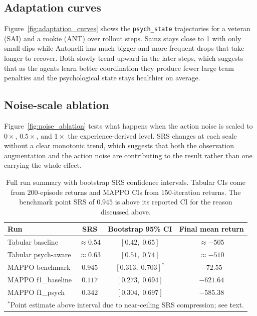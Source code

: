 \documentclass[11pt]{article}
\begin{document}
\subsection*{Adaptation curves}
Figure~\ref{fig:adaptation_curves} shows the \texttt{psych\_state} trajectories for a
veteran (SAI) and a rookie (ANT) over rollout steps. Sainz stays close to 1 with only
small dips while Antonelli has much bigger and more frequent drops that take longer to
recover. Both slowly trend upward in the later steps, which suggests that as the agents
learn better coordination they produce fewer large team penalties and the psychological
state stays healthier on average.

\subsection*{Noise-scale ablation}
Figure~\ref{fig:noise_ablation} tests what happens when the action noise is scaled to
$0\times$, $0.5\times$, and $1\times$ the experience-derived level. SRS changes at each
scale without a clear monotonic trend, which suggests that both the observation
augmentation and the action noise are contributing to the result rather than one carrying
the whole effect.

\begin{table}[h]
  \caption{Full run summary with bootstrap SRS confidence intervals. Tabular CIs come
  from 200-episode returns and MAPPO CIs from 150-iteration returns. The benchmark
  point SRS of $0.945$ is above its reported CI for the reason discussed above.}
  \label{tab:eval_summary_updated}
  \centering
  \small
  \begin{tabular}{lccc}
    \toprule
    Run & SRS & Bootstrap 95\% CI & Final mean return \\
    \midrule
    Tabular baseline    & $\approx 0.54$ & $[0.42,\; 0.65]$ & $\approx -505$ \\
    Tabular psych-aware & $\approx 0.63$ & $[0.51,\; 0.74]$ & $\approx -510$ \\
    MAPPO benchmark     & $0.945$        & $[0.313,\; 0.703]^{*}$ & $-72.55$ \\
    MAPPO f1\_baseline  & $0.117$        & $[0.273,\; 0.694]$ & $-621.64$ \\
    MAPPO f1\_psych     & $0.342$        & $[0.304,\; 0.697]$ & $-585.38$ \\
    \bottomrule
    \multicolumn{4}{l}{\small $^{*}$Point estimate above interval due to near-ceiling SRS compression; see text.}
  \end{tabular}
\end{table}
\end{document}
